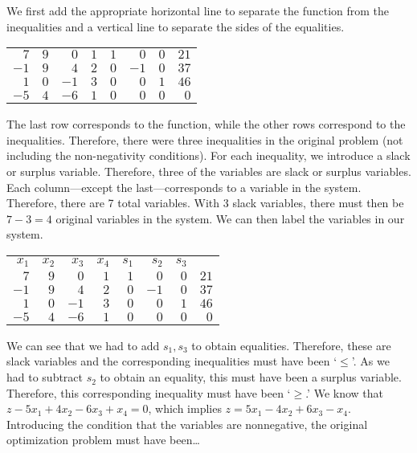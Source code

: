 \documentclass[11pt,letterpaper]{article}
\begin{document}
\sol We first add the appropriate horizontal line to separate the function from the inequalities and a vertical line to separate the sides of the equalities. \par
	\begin{table}[H]
	\centering
	\begin{tabular}{rrrrrrr|r}
	$7$ & $9$ & $0$ & $1$ & $1$ & $0$ & $0$ & $21$ \\
	$-1$ & $9$ & $4$ & $2$ & $0$ & $-1$ & $0$ & $37$ \\
	$1$ & $0$ & $-1$ & $3$ & $0$ & $0$ & $1$ & $46$ \\ \hline
	$-5$ & $4$ & $-6$ & $1$ & $0$ & $0$ & $0$ & $0$ \\
	\end{tabular}
	\end{table} \par
The last row corresponds to the function, while the other rows correspond to the inequalities. Therefore, there were three inequalities in the original problem (not including the non-negativity conditions). For each inequality, we introduce a slack or surplus variable. Therefore, three of the variables are slack or surplus variables. Each column---except the last---corresponds to a variable in the system. Therefore, there are 7 total variables. With 3 slack variables, there must then be $7- 3= 4$ original variables in the system. We can then label the variables in our system. \par
	\begin{table}[H]
	\centering
	\begin{tabular}{rrrrrrrr}
	{\footnotesize $x_1$} & {\footnotesize $x_2$} & {\footnotesize $x_3$} & {\footnotesize $x_4$} & {\footnotesize $s_1$} & {\footnotesize $s_2$} & {\footnotesize $s_3$} & \\
	$7$ & $9$ & $0$ & $1$ & $1$ & $0$ & \multicolumn{1}{r|}{$0$} & $21$ \\
	$-1$ & $9$ & $4$ & $2$ & $0$ & $-1$ & \multicolumn{1}{r|}{$0$} & $37$ \\
	$1$ & $0$ & $-1$ & $3$ & $0$ & $0$ & \multicolumn{1}{r|}{$1$} & $46$ \\ \hline
	$-5$ & $4$ & $-6$ & $1$ & $0$ & $0$ & \multicolumn{1}{r|}{$0$} & $0$ \\
	\end{tabular}
	\end{table} \par
We can see that we had to add $s_1, s_3$ to obtain equalities. Therefore, these are slack variables and the corresponding inequalities must have been `$\leq$'. As we had to subtract $s_2$ to obtain an equality, this must have been a surplus variable. Therefore, this corresponding inequality must have been `$\geq$.' We know that $z - 5x_1 + 4x_2 - 6x_3 + x_4= 0$, which implies $z= 5x_1 - 4x_2 + 6x_3 - x_4$. Introducing the condition that the variables are nonnegative, the original optimization problem must have been\dots
\end{document}

